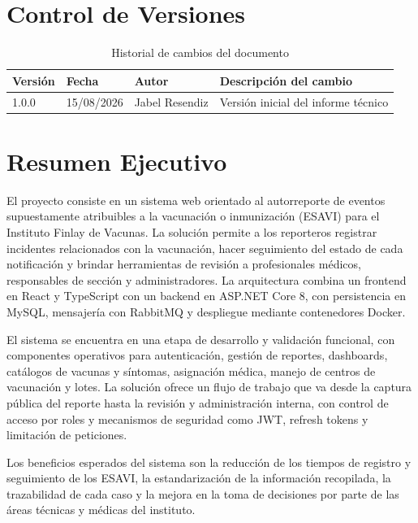 \documentclass[12pt,letterpaper]{article}
\begin{document}
\section*{Control de Versiones}

\begin{table}[H]
\centering
\caption{Historial de cambios del documento}
\label{tab:historial}
\begin{tabular}{|l|l|l|l|}
\hline
\textbf{Versión} & \textbf{Fecha} & \textbf{Autor} & \textbf{Descripción del cambio} \\ \hline
1.0.0 & 15/08/2026 & Jabel Resendiz & Versión inicial del informe técnico \\ \hline
\end{tabular}
\end{table}



	\newpage
	\section{Resumen Ejecutivo}

El proyecto consiste en un sistema web orientado al autorreporte de eventos supuestamente atribuibles a la vacunación o inmunización (ESAVI) para el Instituto Finlay de Vacunas. La solución permite a los reporteros registrar incidentes relacionados con la vacunación, hacer seguimiento del estado de cada notificación y brindar herramientas de revisión a profesionales médicos, responsables de sección y administradores. La arquitectura combina un frontend en React y TypeScript con un backend en ASP.NET Core 8, con persistencia en MySQL, mensajería con RabbitMQ y despliegue mediante contenedores Docker.

El sistema se encuentra en una etapa de desarrollo y validación funcional, con componentes operativos para autenticación, gestión de reportes, dashboards, catálogos de vacunas y síntomas, asignación médica, manejo de centros de vacunación y lotes. La solución ofrece un flujo de trabajo que va desde la captura pública del reporte hasta la revisión y administración interna, con control de acceso por roles y mecanismos de seguridad como JWT, refresh tokens y limitación de peticiones.

Los beneficios esperados del sistema son la reducción de los tiempos de registro y seguimiento de los ESAVI, la estandarización de la información recopilada, la trazabilidad de cada caso y la mejora en la toma de decisiones por parte de las áreas técnicas y médicas del instituto.
\end{document}
